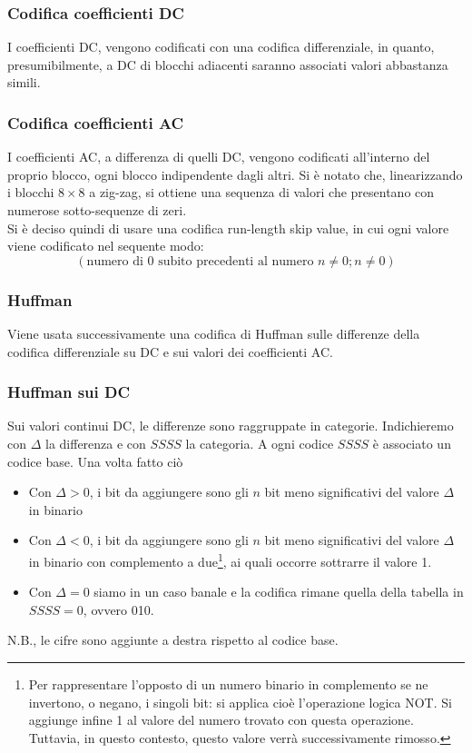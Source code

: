 \documentclass{report}
\begin{document}
	\subsubsection{Codifica coefficienti DC}
	I coefficienti DC, vengono codificati con una codifica differenziale, in quanto, presumibilmente, a DC di blocchi adiacenti saranno associati valori abbastanza simili.
		
	\subsubsection{Codifica coefficienti AC}
	I coefficienti AC, a differenza di quelli DC, vengono codificati all'interno del proprio blocco, ogni blocco indipendente dagli altri. Si è notato che, linearizzando i blocchi $8\times8$ a zig-zag, si ottiene una sequenza di valori che presentano con numerose sotto-sequenze di zeri.\\
	Si è deciso quindi di usare una codifica run-length skip value, in cui ogni valore viene codificato nel sequente modo:
	$$
	( \text{numero di 0 subito precedenti al numero } n \neq 0; n\neq 0)
	$$
		
	\newpage
	\subsubsection{Huffman}
	Viene usata successivamente una codifica di Huffman sulle differenze della codifica differenziale su DC e sui valori dei coefficienti AC.
		
	\subsubsection{Huffman sui DC}
	Sui valori continui DC, le differenze sono raggruppate in categorie. Indichieremo con $\Delta$ la differenza e con $SSSS$ la categoria. 
	A ogni codice $SSSS$ è associato un codice base. Una volta fatto ciò
	\begin{itemize}
		\item Con $\Delta>0$, i bit da aggiungere sono gli $n$ bit meno significativi del valore $\Delta$ in binario
		\item Con $\Delta<0$, i bit da aggiungere sono gli $n$ bit meno significativi del valore $\Delta$ in binario con complemento a due\footnote{Per rappresentare l'opposto di un numero binario in complemento se ne invertono, o negano, i singoli bit: si applica cioè l'operazione logica NOT. Si aggiunge infine 1 al valore del numero trovato con questa operazione. Tuttavia, in questo contesto, questo valore verrà successivamente rimosso.}, ai quali occorre sottrarre il valore 1.
		\item Con $\Delta=0$ siamo in un caso banale e la codifica rimane quella della tabella in $SSSS=0$, ovvero 010.
		      		          
	\end{itemize}
	N.B., le cifre sono aggiunte a destra rispetto al codice base.
		
\end{document}
